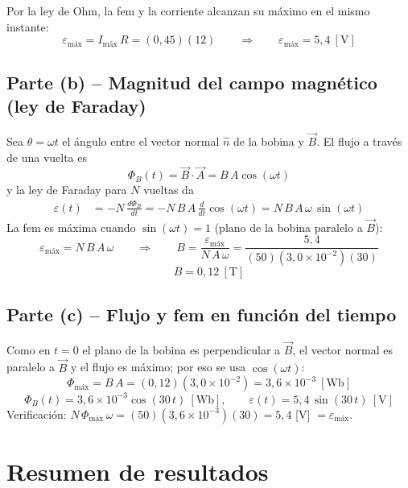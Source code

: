 \documentclass[12pt,letterpaper]{article}
\begin{document}
Por la ley de Ohm, la fem y la corriente alcanzan su m\'aximo en el mismo instante:
\[
    \varepsilon_{\text{m\'ax}} = I_{\text{m\'ax}}\,R = (0{,}45)(12)
    \qquad\Longrightarrow\qquad
    \boxed{\varepsilon_{\text{m\'ax}} = 5{,}4\ [\text{V}]}
\]

\subsection*{Parte (b) -- Magnitud del campo magn\'etico (ley de Faraday)}

Sea $\theta = \omega t$ el \'angulo entre el vector normal $\hat{n}$ de la bobina y $\vec{B}$. El
flujo a trav\'es de una vuelta es
\[
    \Phi_B(t) = \vec{B}\cdot\vec{A} = B\,A\cos(\omega t)
\]
y la ley de Faraday para $N$ vueltas da
\begin{align*}
    \varepsilon(t) &= -N\,\frac{d\Phi_B}{dt} = -N\,B\,A\,\frac{d}{dt}\cos(\omega t)
    = N\,B\,A\,\omega\,\sin(\omega t)
\end{align*}
La fem es m\'axima cuando $\sin(\omega t) = 1$ (plano de la bobina paralelo a $\vec{B}$):
\[
    \varepsilon_{\text{m\'ax}} = N\,B\,A\,\omega
    \qquad\Longrightarrow\qquad
    B = \frac{\varepsilon_{\text{m\'ax}}}{N\,A\,\omega} = \frac{5{,}4}{(50)(3{,}0\times10^{-2})(30)}
\]
\[
    \boxed{B = 0{,}12\ [\text{T}]}
\]

\subsection*{Parte (c) -- Flujo y fem en funci\'on del tiempo}

Como en $t = 0$ el plano de la bobina es perpendicular a $\vec{B}$, el vector normal es paralelo a
$\vec{B}$ y el flujo es m\'aximo; por eso se usa $\cos(\omega t)$:
\[
    \Phi_{\text{m\'ax}} = B\,A = (0{,}12)(3{,}0\times10^{-2}) = 3{,}6\times10^{-3}\ [\text{Wb}]
\]
\[
    \boxed{\Phi_B(t) = 3{,}6\times10^{-3}\cos(30\,t)\ [\text{Wb}],\qquad
    \varepsilon(t) = 5{,}4\,\sin(30\,t)\ [\text{V}]}
\]
\noindent Verificaci\'on: $N\,\Phi_{\text{m\'ax}}\,\omega = (50)(3{,}6\times10^{-3})(30) = 5{,}4$ [V]
$= \varepsilon_{\text{m\'ax}}$.

\section*{Resumen de resultados}
\end{document}
